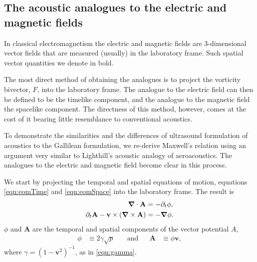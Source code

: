 \documentclass[10pt, fleqn,final,showtrims,oldfontcommands, article,a4paper,oneside]{memoir} %
\newcommand{\sub}[1]{\begin{subequations}#1\end{subequations}}
\newcommand{\eqnref}[1]{\ref{eqn:#1}}
\newcommand{\lr}[1]{\left( #1 \right)}
\renewcommand{\d}{\partial}
\newcommand{\del}{\nabla}
\newcommand{\vdel}{ \mbox{\boldmath $\del$}}
\newcommand{\dt}{{\d_t}}
\newcommand{\g}{\gamma_0}
\newcommand{\vA}{\textbf{A}}
\newcommand{\vv}{\textbf{v}}
\begin{document}





\subsection{The acoustic analogues to the electric and magnetic fields}\label{sec:int:EM}

In classical electromagnetism the electric and magnetic fields are 
3-dimensional vector fields that are measured (usually) in the laboratory frame.
Such spatial vector quantities we denote in bold.

The most direct method of obtaining the analogues  is to project the vorticity bivector, $F$, into the laboratory  frame\cite{Hestenes2003, Doran2003}.
The analogue to the electric field can then be defined to be the timelike component, and the analogue to the magnetic field the spacelike component.
The directness of this method, however, comes at the cost of it bearing little  resemblance to conventional acoustics.

To demonstrate the similarities and the differences of ultrasound formulation of acoustics  to the Gallilean formulation,
we re-derive Maxwell's relation using an argument very similar to Lighthill's acoustic analogy\cite{Lighthill1952} of aeroacoustics.
The analogues to the electric and magnetic field  become clear in this process.

We start  by projecting the temporal and spatial equations of motion, equations \eqnref{eomTime} and \eqnref{eomSpace}
into the laboratory frame.
The result is
\sub{
  \begin{align}
     \vdel \cdot \vA &=  - \dt \phi, \label{eqn:Rcontinuity}\\ %
\dt \vA - \vv \times  \lr{\vdel \times \vA} \label{eqn:REuler}
&= - \vdel \phi.
  \end{align}
}
$\phi$ and $\vA$ are the temporal and spatial components of the vector potential $A$,
\begin{align}
\phi &\equiv  2\gamma \sqrt {p}   %
& \quad\text{and} &&
\vA &\equiv  \phi \vv,  %
 \end{align}
where $\gamma = (1-\vv^2)^{-1}$, as in \eqnref{gamma}.
\end{document}
